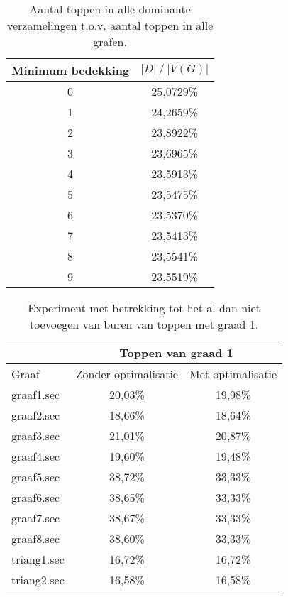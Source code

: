 \documentclass[11pt, a4paper, table]{article}
\theoremstyle{definition}
\begin{document}
\begin{table}
	\centering
	\begin{tabular}{|c|c|}
		\hline
		Minimum bedekking & $|D|\ /\ |V(G)|$		\\ \hline
		0 & 25,0729\% \\ \hline
		1 & 24,2659\% \\ \hline
		2 & 23,8922\% \\ \hline
		3 & 23,6965\% \\ \hline
		4 & 23,5913\% \\ \hline
		5 & 23,5475\% \\ \hline
		6 &\cellcolor{LimeGreen} 23,5370\% \\ \hline
		7 & 23,5413\% \\ \hline
		8 & 23,5541\% \\ \hline
		9 & 23,5519\% \\ \hline
	\end{tabular}
	\caption{Aantal toppen in alle dominante verzamelingen t.o.v. aantal toppen in alle grafen.}
	\label{tabel:bedekking3}
\end{table}

\begin{table}
	\centering
	\begin{tabular}{|l|c|c|}
		\hline
		& \multicolumn{2}{c|}{Toppen van graad 1}		\\ \hline
		Graaf & Zonder optimalisatie  & Met optimalisatie 		\\ \hline
		graaf1.sec & 20,03\% &  \cellcolor{LimeGreen}19,98\%		\\ \hline
		graaf2.sec & 18,66\% &  \cellcolor{LimeGreen}18,64\%		\\ \hline
		graaf3.sec & 21,01\% &  \cellcolor{LimeGreen}20,87\%		\\ \hline
		graaf4.sec & 19,60\% &  \cellcolor{LimeGreen}19,48\%		\\ \hline
		graaf5.sec & 38,72\% &  \cellcolor{LimeGreen}33,33\%		\\ \hline
		graaf6.sec & 38,65\% &  \cellcolor{LimeGreen}33,33\%		\\ \hline
		graaf7.sec & 38,67\% &  \cellcolor{LimeGreen}33,33\%		\\ \hline
		graaf8.sec & 38,60\% &  \cellcolor{LimeGreen}33,33\%		\\ \hline
		triang1.sec &  \cellcolor{LimeGreen}16,72\% & 16,72\%		\\ \hline
		triang2.sec &  \cellcolor{LimeGreen}16,58\% & 16,58\%		\\ \hline
	\end{tabular}
	\caption{Experiment met betrekking tot het al dan niet toevoegen van buren van toppen met graad 1.}
	\label{table:oneneighbour}
\end{table}
\end{document}
